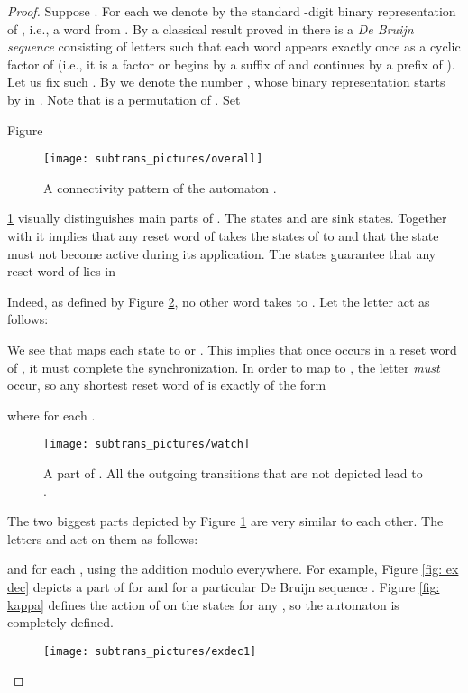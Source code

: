 \documentclass{ws-ijmpc}
\begin{document}
\begin{proof}
Suppose . For each  we denote by 
the standard -digit binary representation of , i.e., a word
from . By a classical
result proved in \citep{stm1} there is a \emph{De Bruijn sequence}
 consisting of letters 
such that each word 
appears exactly once as a cyclic factor of  (i.e., it is a factor
or begins by a suffix of  and continues by a prefix of ).
Let us fix such . By  we denote the number
, whose binary representation  starts by
 in . Note that  is a permutation of .
Set

Figure 
\begin{figure}
\begin{centering}
\texttt{[image: subtrans\_pictures/overall]}
\par\end{centering}

\caption{A connectivity pattern of the automaton .\label{fig: overall}}
\end{figure}
\ref{fig: overall} visually distinguishes main parts of . The
states  and  are sink states.
Together with  it implies that any reset word of
 takes the states of  to  and that the state
 must not become active during its application.
The states  guarantee that any
reset word of  lies in

Indeed, as defined by Figure \ref{fig: watch}, no other word takes
 to . Let the letter  act as
follows:

We see that  maps each state to  or .
This implies that once  occurs in a reset word of , it
must complete the synchronization. In order to map 
to , the letter  \emph{must }occur, so any shortest
reset word of  is exactly of the form

where  for
each .

\begin{figure}
\begin{centering}
\texttt{[image: subtrans\_pictures/watch]}
\par\end{centering}

\caption{\label{fig: watch}A part of . All the outgoing transitions that
are not depicted lead to .}
\end{figure}
 

The two biggest parts depicted by Figure \ref{fig: overall} are very
similar to each other. The letters  and 
act on them as follows:

and 
for each ,
using the addition modulo  everywhere. For example, Figure \ref{fig: ex dec}
depicts a part of  for  and for a particular De Bruijn sequence
. Figure \ref{fig: kappa} defines the action of  on
the states 
for any , so the automaton  is completely defined.
\begin{figure}
\begin{centering}
\texttt{[image: subtrans\_pictures/exdec1]}
\par\end{centering}


\end{figure}
\end{proof}
\end{document}
